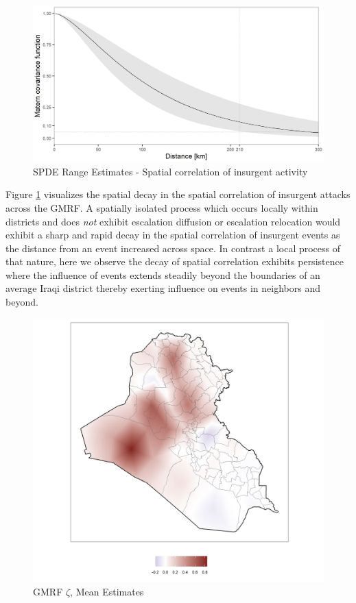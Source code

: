 \documentclass[12pt]{article}
\begin{document}
\begin{figure}[!h]
  \centering
  \includegraphics{figure-spde_range.png}
  \caption{SPDE Range Estimates - Spatial correlation of insurgent activity}
  \label{figure:spde_range}
\end{figure}

Figure \ref{figure:spde_range} visualizes the spatial decay in the spatial correlation of insurgent attacks across the GMRF. A spatially isolated process which occurs locally within districts and does \textit{not} exhibit escalation diffusion or escalation relocation would exhibit a sharp and rapid decay in the spatial correlation of insurgent events as the distance from an event increased across space. In contrast a local process of that nature, here we observe the decay of spatial correlation exhibits persistence where the influence of events extends steadily beyond the boundaries of an average Iraqi district thereby exerting influence on events in neighbors and beyond.

\begin{figure}[!h]
  \centering
  \includegraphics{figure-gmrf_mean.png}
  \caption{GMRF $\zeta$, Mean Estimates}
  \label{figure:map_gmrf}
\end{figure}
\end{document}
